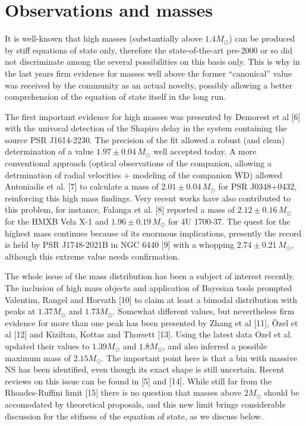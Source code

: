 \documentclass[a4paper]{jpconf}
\begin{document}
\section{Observations and masses}
It is well-known that high masses (substantially above $1.4 M_{\odot}$) can be produced by stiff equations of state only, 
therefore the state-of-the-art pre-2000 or so did not discriminate among the several possibilities on this basis only.
This is why in the last years firm evidence for masses well above the former ``canonical'' value was received by the community 
as an actual novelty, possibly allowing a better comprehension of the equation of state itself in the long run.

The first important evidence for high masses was presented by Demorest et al [6] with the univocal detection of 
the Shapiro delay in the system containing the source PSR J1614-2230. The precision of the fit allowed a robust (and clean)
determination of a value $1.97 \pm 0.04 \, M_{\odot}$ well accepted today. A more conventional approach (optical observations 
of the companion, allowing a detrmination of radial velocities + modeling of the companion WD) allowed Antoniadis et al. [7] 
to calculate a mass of $2.01 \pm 0.04 \, M_{\odot}$ for PSR J0348+0432, reinforcing this high mass findings. 
Very recent works have also contributed to this problem, for instance, Falanga et al. [8] reported a mass of 
$2.12 \pm 0.16 \, M_{\odot}$ for the HMXB Vela X-1 and $1.96 \pm 0.19 \, M_{\odot}$ for 4U 1700-37. The quest for 
the highest mass continues because of its enormous implications, presently the record is held by PSR J1748-2021B in NGC 6440 [9]
with a whopping $2.74 \pm 0.21 \, M_{\odot}$, although this extreme value needs confirmation. 

The whole issue of the mass distribution has been a subject of interest recently. The inclusion of high mass objects and 
application of Bayesian tools prompted Valentim, Rangel and Horvath [10] to claim at least a bimodal distribution 
with peaks at $1.37  M_{\odot}$ and $1.73  M_{\odot}$. Somewhat different values, but nevertheless firm evidence for more 
than one peak has been presented by Zhang et al [11], \"Ozel et al [12] and Kiziltan, Kottas and Thorsett [13].
Using the latest data Ozel et al. updated their values to $1.39  M_{\odot}$ and $1.8  M_{\odot}$, and also inferred a 
possible maximum mass of $2.15 M_{\odot}$. The important point here is that a bin with massive NS has been identified, 
even though its exact shape is still uncertain. Recent reviews on this issue can be found in [5] and [14].
While still far from the Rhoades-Ruffini limit [15] there is no question that masses above $2 M_{\odot}$ should be 
accomodated by theoretical proposals, and this new limit brings considerable discussion for the stifness of the 
equation of state, as we discuss below.
\end{document}

